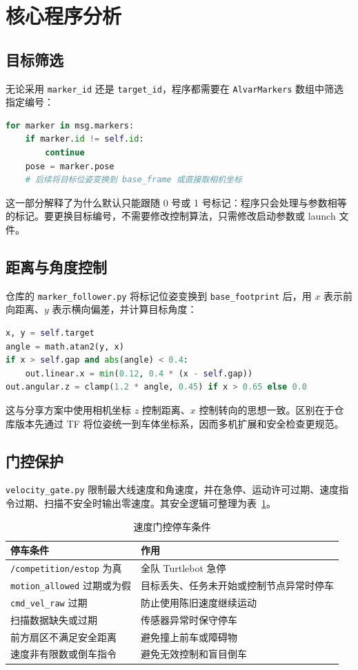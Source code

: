 \documentclass[UTF8,a4paper,12pt]{ctexart}
\begin{document}
	\section{核心程序分析}

	\subsection{目标筛选}
	无论采用 \texttt{marker\_id} 还是 \texttt{target\_id}，程序都需要在 \texttt{AlvarMarkers} 数组中筛选指定编号：
	\begin{lstlisting}[language=Python]
for marker in msg.markers:
    if marker.id != self.id:
        continue
    pose = marker.pose
    # 后续将目标位姿变换到 base_frame 或直接取相机坐标
	\end{lstlisting}
	这一部分解释了为什么默认只能跟随 0 号或 1 号标记：程序只会处理与参数相等的标记。要更换目标编号，不需要修改控制算法，只需修改启动参数或 launch 文件。

	\subsection{距离与角度控制}
	仓库的 \texttt{marker\_follower.py} 将标记位姿变换到 \texttt{base\_footprint} 后，用 \(x\) 表示前向距离、\(y\) 表示横向偏差，并计算目标角度：
	\begin{lstlisting}[language=Python]
x, y = self.target
angle = math.atan2(y, x)
if x > self.gap and abs(angle) < 0.4:
    out.linear.x = min(0.12, 0.4 * (x - self.gap))
out.angular.z = clamp(1.2 * angle, 0.45) if x > 0.65 else 0.0
	\end{lstlisting}
	这与分享方案中使用相机坐标 \(z\) 控制距离、\(x\) 控制转向的思想一致。区别在于仓库版本先通过 TF 将位姿统一到车体坐标系，因而多机扩展和安全检查更规范。

	\subsection{门控保护}
	\texttt{velocity\_gate.py} 限制最大线速度和角速度，并在急停、运动许可过期、速度指令过期、扫描不安全时输出零速度。其安全逻辑可整理为表~\ref{tab:safety}。

	\begin{table}[H]
		\centering
		\caption{速度门控停车条件}
		\label{tab:safety}
		\begin{tabular}{ll}
			\toprule
			停车条件 & 作用 \\
			\midrule
			\texttt{/competition/estop} 为真 & 全队 Turtlebot 急停 \\
			\texttt{motion\_allowed} 过期或为假 & 目标丢失、任务未开始或控制节点异常时停车 \\
			\texttt{cmd\_vel\_raw} 过期 & 防止使用陈旧速度继续运动 \\
			扫描数据缺失或过期 & 传感器异常时保守停车 \\
			前方扇区不满足安全距离 & 避免撞上前车或障碍物 \\
			速度非有限数或倒车指令 & 避免无效控制和盲目倒车 \\
			\bottomrule
		\end{tabular}
	\end{table}
\end{document}
